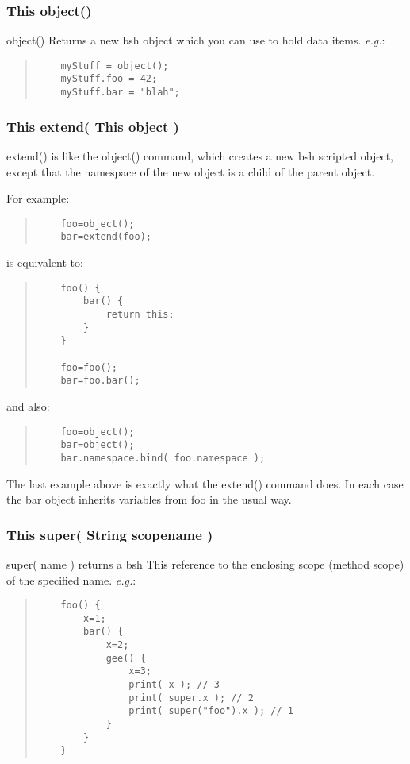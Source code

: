 \documentclass[twoside,11pt]{article}
\renewcommand{\_}{\texttt{\symbol{95}}}
\newcommand{\eg}{\textit{e.g.}}
\begin{document}
\subsubsection*{This object()}
object() Returns a new bsh object which you can use to hold data
items. \eg:
\begin{quote}
\begin{verbatim}
    myStuff = object();
    myStuff.foo = 42;
    myStuff.bar = "blah";
\end{verbatim}
\end{quote}

\subsubsection*{This extend( This object )}
extend() is like the object() command, which
creates a new bsh scripted object, except that the namespace of
the new object is a child of the parent object.

For example:
\begin{quote}
\begin{verbatim}
    foo=object();
    bar=extend(foo);
\end{verbatim}
\end{quote}
is equivalent to:
\begin{quote}
\begin{verbatim}
    foo() {
        bar() {
            return this;
        }
    }

    foo=foo();
    bar=foo.bar();
\end{verbatim}
\end{quote}
and also:
\begin{quote}
\begin{verbatim}
    foo=object();
    bar=object();
    bar.namespace.bind( foo.namespace );
\end{verbatim}
\end{quote}

The last example above is exactly what the extend() command does.
In each case the bar object inherits variables from foo in the usual way.

\subsubsection*{This super( String scopename )}
super( name ) returns a bsh This reference to the enclosing scope
(method scope) of the specified name. \eg:
\begin{quote}
\begin{verbatim}
    foo() {
        x=1;
        bar() {
            x=2;
            gee() {
                x=3;
                print( x ); // 3
                print( super.x ); // 2
                print( super("foo").x ); // 1
            }
        }
    }
\end{verbatim}
\end{quote}
\end{document}
